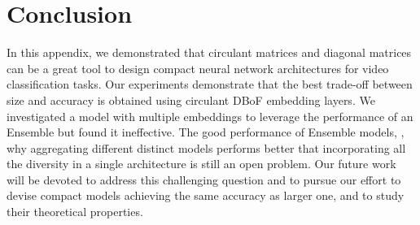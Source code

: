 \section{Conclusion}
\label{section:ap2-conclusion}

In this appendix, we demonstrated that circulant matrices and diagonal matrices can be a great tool to design compact neural network architectures for video classification tasks.
Our experiments demonstrate that the best trade-off between size and accuracy is obtained using circulant DBoF embedding layers.
We investigated a model with multiple embeddings to leverage the performance of an Ensemble but found it ineffective.
The good performance of Ensemble models, \ie, why aggregating different distinct models performs better that incorporating all the diversity in a single architecture is still an open problem.
Our future work will be devoted to address this challenging question and to pursue our effort to devise compact models achieving the same accuracy as larger one, and to study their theoretical properties.

\newpage


